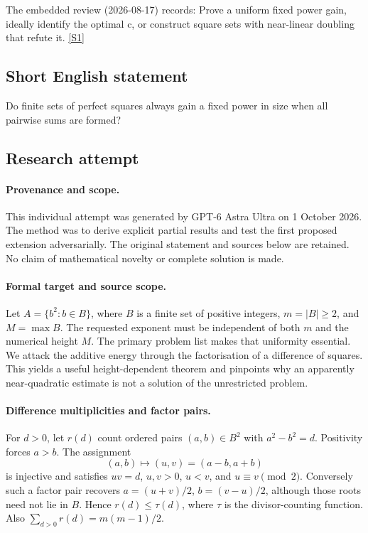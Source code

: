 \documentclass[11pt,a4paper]{article}
\newcommand{\sref}[2]{\hyperlink{source:#1:#2}{[S#2]}}
\begin{document}
The embedded review (2026-08-17) records: Prove a uniform fixed power gain, ideally identify the optimal c, or construct square sets with near-linear doubling that refute it. \sref{statement}{1}

\subsection{Short English statement}

Do finite sets of perfect squares always gain a fixed power in size when all pairwise sums are formed?

\subsection{Research attempt}

\paragraph{Provenance and scope.}
This individual attempt was generated by GPT-6 Astra Ultra on 1 October 2026. The method was to derive explicit partial results and test the first proposed extension adversarially. The original statement and sources below are retained. No claim of mathematical novelty or complete solution is made.

\paragraph{Formal target and source scope.}
Let $A=\{b^2:b\in B\}$, where $B$ is a finite set of positive integers, $m=|B|\geq2$, and $M=\max B$. The requested exponent must be independent of both $m$ and the numerical height $M$. The primary problem list makes that uniformity essential. We attack the additive energy through the factorisation of a difference of squares. This yields a useful height-dependent theorem and pinpoints why an apparently near-quadratic estimate is not a solution of the unrestricted problem.

\paragraph{Difference multiplicities and factor pairs.}
For $d>0$, let $r(d)$ count ordered pairs $(a,b)\in B^2$ with $a^2-b^2=d$. Positivity forces $a>b$. The assignment
\[
 (a,b)\longmapsto(u,v)=(a-b,a+b)
\]
is injective and satisfies $uv=d$, $u,v>0$, $u<v$, and $u\equiv v\pmod2$. Conversely such a factor pair recovers $a=(u+v)/2$, $b=(v-u)/2$, although those roots need not lie in $B$. Hence $r(d)\leq\tau(d)$, where $\tau$ is the divisor-counting function. Also $\sum_{d>0}r(d)=m(m-1)/2$.
\end{document}
